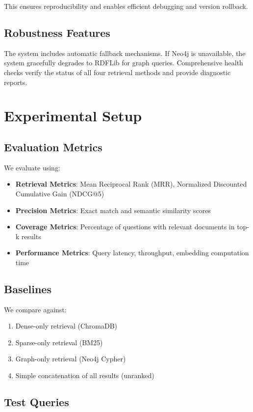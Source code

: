 \documentclass[11pt,a4paper]{article}
\begin{document}
This ensures reproducibility and enables efficient debugging and version rollback.

\subsection{Robustness Features}

The system includes automatic fallback mechanisms. If Neo4j is unavailable, the system gracefully degrades to RDFLib for graph queries. Comprehensive health checks verify the status of all four retrieval methods and provide diagnostic reports.

\section{Experimental Setup}

\subsection{Evaluation Metrics}

We evaluate using:
\begin{itemize}
\item \textbf{Retrieval Metrics}: Mean Reciprocal Rank (MRR), Normalized Discounted Cumulative Gain (NDCG@5)
\item \textbf{Precision Metrics}: Exact match and semantic similarity scores
\item \textbf{Coverage Metrics}: Percentage of questions with relevant documents in top-k results
\item \textbf{Performance Metrics}: Query latency, throughput, embedding computation time
\end{itemize}

\subsection{Baselines}

We compare against:
\begin{enumerate}
\item Dense-only retrieval (ChromaDB)
\item Sparse-only retrieval (BM25)
\item Graph-only retrieval (Neo4j Cypher)
\item Simple concatenation of all results (unranked)
\end{enumerate}

\subsection{Test Queries}
\end{document}
